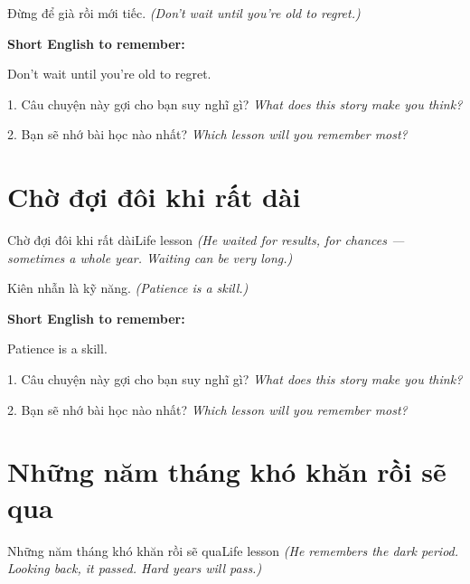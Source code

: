 \begin{baihoc}
Đừng để già rồi mới tiếc.
\textit{(Don't wait until you're old to regret.)}
\end{baihoc}

\begin{ghinhoanh}
\textbf{Short English to remember:}

Don't wait until you're old to regret.

\end{ghinhoanh}

\begin{tuhocnhanh}
1. Câu chuyện này gợi cho bạn suy nghĩ gì? \textit{What does this story make you think?}

2. Bạn sẽ nhớ bài học nào nhất? \textit{Which lesson will you remember most?}
\end{tuhocnhanh}
\ngancach


\section{Chờ đợi đôi khi rất dài}
\begin{truyen}{Chờ đợi đôi khi rất dài}{Life lesson}
\textit{(He waited for results, for chances — sometimes a whole year. Waiting can be very long.)}
\end{truyen}

\begin{baihoc}
Kiên nhẫn là kỹ năng.
\textit{(Patience is a skill.)}
\end{baihoc}

\begin{ghinhoanh}
\textbf{Short English to remember:}

Patience is a skill.

\end{ghinhoanh}

\begin{tuhocnhanh}
1. Câu chuyện này gợi cho bạn suy nghĩ gì? \textit{What does this story make you think?}

2. Bạn sẽ nhớ bài học nào nhất? \textit{Which lesson will you remember most?}
\end{tuhocnhanh}
\ngancach


\section{Những năm tháng khó khăn rồi sẽ qua}
\begin{truyen}{Những năm tháng khó khăn rồi sẽ qua}{Life lesson}
\textit{(He remembers the dark period. Looking back, it passed. Hard years will pass.)}
\end{truyen}

